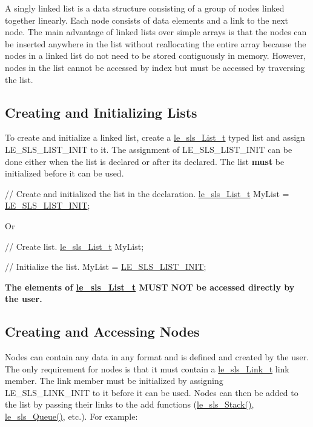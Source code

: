 A singly linked list is a data structure consisting of a group of nodes linked together linearly. Each node consists of data elements and a link to the next node. The main advantage of linked lists over simple arrays is that the nodes can be inserted anywhere in the list without reallocating the entire array because the nodes in a linked list do not need to be stored contiguously in memory. However, nodes in the list cannot be accessed by index but must be accessed by traversing the list.\hypertarget{c_singly_linked_list_sls_createList}{}\subsection{Creating and Initializing Lists}\label{c_singly_linked_list_sls_createList}
To create and initialize a linked list, {\ttfamily create} a \hyperlink{structle__sls___list__t}{le\+\_\+sls\+\_\+\+List\+\_\+t} typed list and assign L\+E\+\_\+\+S\+L\+S\+\_\+\+L\+I\+S\+T\+\_\+\+I\+N\+I\+T to it. The assignment of L\+E\+\_\+\+S\+L\+S\+\_\+\+L\+I\+S\+T\+\_\+\+I\+N\+I\+T can be done either when the list is declared or after it\textquotesingle{}s declared. The list {\bfseries must} be initialized before it can be used.


\begin{DoxyCode}
\textcolor{comment}{// Create and initialized the list in the declaration.}
\hyperlink{structle__sls___list__t}{le\_sls\_List\_t} MyList = \hyperlink{le__singly_linked_list_8h_a2e1013c24e2c826dbba37a761c5d9f44}{LE\_SLS\_LIST\_INIT};
\end{DoxyCode}


Or


\begin{DoxyCode}
\textcolor{comment}{// Create list.}
\hyperlink{structle__sls___list__t}{le\_sls\_List\_t} MyList;

\textcolor{comment}{// Initialize the list.}
MyList = \hyperlink{le__singly_linked_list_8h_a2e1013c24e2c826dbba37a761c5d9f44}{LE\_SLS\_LIST\_INIT};
\end{DoxyCode}


{\bfseries  The elements of \hyperlink{structle__sls___list__t}{le\+\_\+sls\+\_\+\+List\+\_\+t} M\+U\+S\+T N\+O\+T be accessed directly by the user. }\hypertarget{c_singly_linked_list_sls_createNode}{}\subsection{Creating and Accessing Nodes}\label{c_singly_linked_list_sls_createNode}
Nodes can contain any data in any format and is defined and created by the user. The only requirement for nodes is that it must contain a \hyperlink{structle__sls___link__t}{le\+\_\+sls\+\_\+\+Link\+\_\+t} link member. The link member must be initialized by assigning L\+E\+\_\+\+S\+L\+S\+\_\+\+L\+I\+N\+K\+\_\+\+I\+N\+I\+T to it before it can be used. Nodes can then be added to the list by passing their links to the add functions (\hyperlink{le__singly_linked_list_8h_aca4266a87d4c5e3dca130cd5d48b99af}{le\+\_\+sls\+\_\+\+Stack()}, \hyperlink{le__singly_linked_list_8h_afb5e8ffc3fb5c0d86eb47d0885a6f546}{le\+\_\+sls\+\_\+\+Queue()}, etc.). For example\+:


